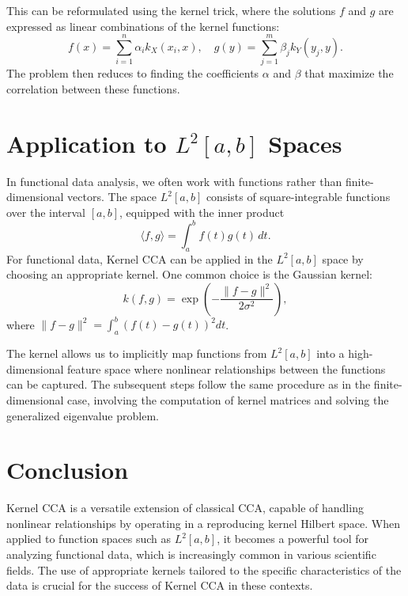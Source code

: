 \documentclass[12pt]{article}
\begin{document}
This can be reformulated using the kernel trick, where the solutions \( f \) and \( g \) are expressed as linear combinations of the kernel functions:
\[
f(x) = \sum_{i=1}^n \alpha_i k_X(x_i, x), \quad g(y) = \sum_{j=1}^m \beta_j k_Y(y_j, y).
\]
The problem then reduces to finding the coefficients \( \alpha \) and \( \beta \) that maximize the correlation between these functions.

\section{Application to \( L^2[a,b] \) Spaces}

In functional data analysis, we often work with functions rather than finite-dimensional vectors. The space \( L^2[a,b] \) consists of square-integrable functions over the interval \( [a, b] \), equipped with the inner product
\[
\langle f, g \rangle = \int_a^b f(t) g(t) \, dt.
\]
For functional data, Kernel CCA can be applied in the \( L^2[a,b] \) space by choosing an appropriate kernel. One common choice is the Gaussian kernel:
\[
k(f, g) = \exp\left(-\frac{\|f - g\|^2}{2\sigma^2}\right),
\]
where \( \|f - g\|^2 = \int_a^b (f(t) - g(t))^2 dt \).

The kernel allows us to implicitly map functions from \( L^2[a,b] \) into a high-dimensional feature space where nonlinear relationships between the functions can be captured. The subsequent steps follow the same procedure as in the finite-dimensional case, involving the computation of kernel matrices and solving the generalized eigenvalue problem.

\section{Conclusion}

Kernel CCA is a versatile extension of classical CCA, capable of handling nonlinear relationships by operating in a reproducing kernel Hilbert space. When applied to function spaces such as \( L^2[a,b] \), it becomes a powerful tool for analyzing functional data, which is increasingly common in various scientific fields. The use of appropriate kernels tailored to the specific characteristics of the data is crucial for the success of Kernel CCA in these contexts.
\end{document}
